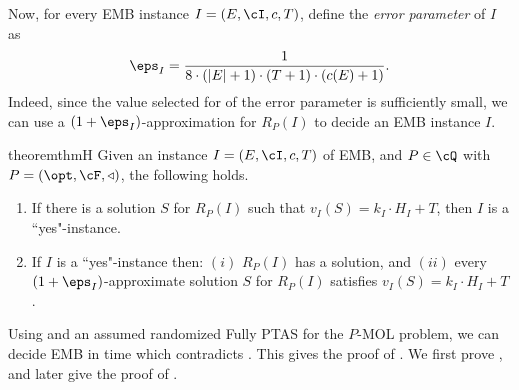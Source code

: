Now, for every EMB instance $I =(E,\cI,c,T)$, define the {\em error parameter} of $I$ as \begin{equation}
\label{eq:epsI}
\eps_I =  \frac{1}{8 \cdot (|E|+1) \cdot (T+1) \cdot \left(c(E)+1\right)}.
\end{equation}
Indeed, since the value selected for of the error parameter is sufficiently small, we can use a $(1+\eps_I)$-approximation for $R_P(I)$ to decide an EMB instance $I$.  
\begin{restatable}{theorem}{thmH}
	\label{thm:H}
	Given an instance $I =(E,\cI,c,T)$ of \textnormal{EMB}, and $P \in \cQ$ with $P = (\opt,\cF,\triangleleft)$, the following holds. 
	\begin{enumerate}
		\item If there is a solution $S$ for $R_P(I)$ such that $v_I(S) = k_I \cdot H_I +T$, then $I$ is a ``yes"-instance.  \label{h:1}
		\item  If $I$ is a ``yes"-instance then: %
		$(i)$ $R_P(I)$ has a solution, and $(ii)$ every $(1+\eps_I)$-approximate solution $S$ for $R_P(I)$ satisfies $v_I(S) = k_I \cdot H_I +T$. \label{h:2}
	\end{enumerate}
\end{restatable}
Using  and an assumed randomized Fully PTAS for the $P$-MOL problem, we can decide EMB in time which contradicts . This gives the proof of . We first prove , and later give the proof of .   

 \thmMain*

